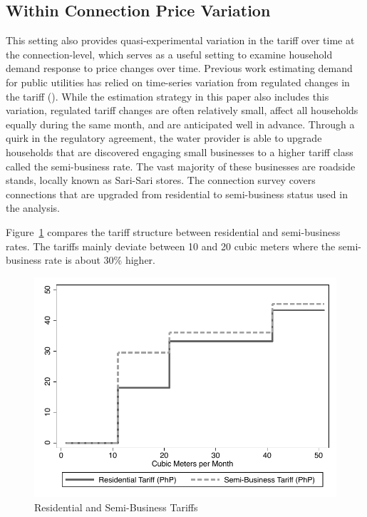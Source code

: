 \documentclass[12pt]{article}
\begin{document}
\begin{appendices}
\subsection{Within Connection Price Variation}\label{appendix:ratechangeelasticity}

This setting also provides quasi-experimental variation in the tariff over time at the connection-level, which serves as a useful setting to examine household demand response to price changes over time.  Previous work estimating demand for public utilities has relied on time-series variation from regulated changes in the tariff (\cite{szabo2015value,mcrae2014infrastructure}).  While the estimation strategy in this paper also includes this variation, regulated tariff changes are often relatively small, affect all households equally during the same month, and are anticipated well in advance.  Through a quirk in the regulatory agreement, the water provider is able to upgrade households that are discovered engaging small businesses to a higher tariff class called the semi-business rate.  The vast majority of these businesses are roadside stands, locally known as Sari-Sari stores.  The connection survey covers connections that are upgraded from residential to semi-business status used in the analysis.

Figure~\ref{figure:ressemi} compares the tariff structure between residential and semi-business rates.  The tariffs mainly deviate between 10 and 20 cubic meters where the semi-business rate is about 30\% higher.

\begin{figure}
\caption{Residential and Semi-Business Tariffs}\label{figure:ressemi}
\begin{center}
\includegraphics[scale=.65]{tables/res_semi_tariff.pdf}
\end{center}
\end{figure}


\end{appendices}
\end{document}
